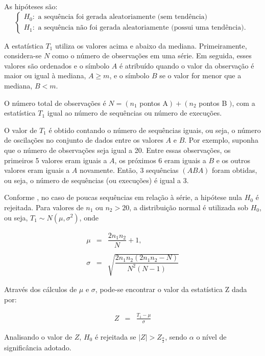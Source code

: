 As hipóteses são:
$$
\left\{\begin{array}{l}
	H_0: \text { a sequência foi gerada aleatoriamente (sem tendência) } \\
	H_1: \text { a sequência não foi gerada aleatoriamente (possui uma tendência). }
\end{array}\right.
$$

A estatística $T_1$ utiliza os valores acima e abaixo da mediana. Primeiramente, considera-se $N$ como o número de observações em uma série. Em seguida, esses valores são ordenados e o símbolo $A$ é atribuído quando o valor da observação é maior ou igual à mediana, $A \geq m$, e o símbolo $B$ se o valor for menor que a mediana, $B<m$.

O número total de observações é $N=\left(n_1\right.$ pontos $\left.\mathrm{A}\right)+\left(n_2\right.$ pontos B $)$, com a estatística $T_1$ igual ao número de sequências ou número de execuções.

O valor de $T_1$ é obtido contando o número de sequências iguais, ou seja, o número de oscilações no conjunto de dados entre os valores $A$ e $B$. Por exemplo, suponha que o número de observações seja igual a 20. Entre essas observações, os primeiros 5 valores eram iguais a $A$, os próximos 6 eram iguais a $B$ e os outros valores eram iguais a $A$ novamente. Então, 3 sequências $(A B A)$ foram obtidas, ou seja, o número de sequências (ou execuções) é igual a 3.

Conforme , no caso de poucas sequências em relação à série, a hipótese nula $H_0$ é rejeitada. Para valores de $n_1$ ou $n_2>20$, a distribuição normal é utilizada sob $H_0$, ou seja, $T_1 \sim N\left(\mu, \sigma^2\right)$, onde

\begin{eqnarray}
	\mu&=&\dfrac{2 n_1 n_2}{N}+1, \\
	\nonumber\\
	 \sigma&=&\sqrt{\dfrac{2 n_1 n_2\left(2 n_1 n_2-N\right)}{N^2(N-1)}} 
\end{eqnarray}


Através dos cálculos de $\mu$ e $\sigma$, pode-se encontrar o valor da estatística $\mathrm{Z}$ dada por:

\begin{eqnarray}
	Z&=&\frac{T_1-\mu}{\sigma}
\end{eqnarray}


Analisando o valor de $Z$, $H_0$ é rejeitada se $|Z|>Z_{\frac{a}{2}}$, sendo $\alpha$ o nível de significância adotado.



